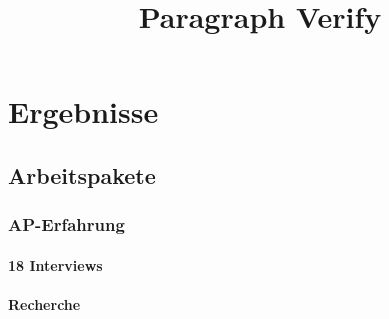 \documentclass[type=zwischenbericht]{zukunftbau}
\title{Paragraph Verify}
\begin{document}
\section{Ergebnisse}
\subsection{Arbeitspakete}
\subsubsection{AP-Erfahrung}
\paragraph{18 Interviews}
\paragraph{Recherche}
\end{document}
